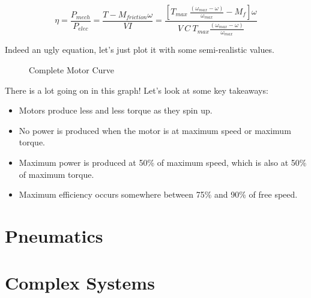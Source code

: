 \documentclass[10pt,letterpaper]{book}
\begin{document}
\begin{equation} \label{eq:motor_efficiency_curve}
  \eta = \frac{P_{mech}}{P_{elec}} = \frac{T-M_{friction} \omega}{V I}
  = \frac{[T_{max} \ \frac{(\omega_{max}-\omega)}{\omega_{max}} - M_f] \omega}{V\ C\ T_{max} \frac{(\omega_{max}-\omega)}{\omega_{max}}} \nonumber
\end{equation}

Indeed an ugly equation, let's just plot it with some semi-realistic values.

\begin{figure}[H] \centering
{}
\caption{Complete Motor Curve}
\end{figure}

There is a lot going on in this graph! Let's look at some key takeaways:
\begin{itemize}
	\item Motors produce less and less torque as they spin up.
	\item No power is produced when the motor is at maximum speed or maximum torque.
	\item Maximum power is produced at 50\% of maximum speed, which is also at 50\% of maximum torque.
	\item Maximum efficiency occurs somewhere between 75\% and 90\% of free speed.
\end{itemize}

\chapter{Pneumatics}
\chapter{Complex Systems}
\end{document}
